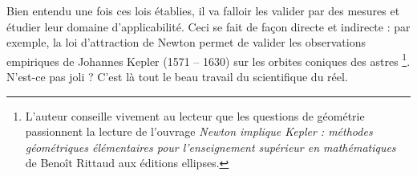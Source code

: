 

\begin{remark}
	Bien entendu une fois ces lois établies, il va falloir les valider par des mesures et étudier leur domaine d'applicabilité. Ceci se fait de façon directe et indirecte : par exemple, la loi d'attraction de Newton permet de valider les observations empiriques de Johannes Kepler (1571 -- 1630) sur les orbites coniques des astres
	\footnote{
		L'auteur conseille vivement au lecteur que les questions de géométrie passionnent la lecture de l'ouvrage \emph{\og Newton implique Kepler : méthodes géométriques élémentaires pour l'enseignement supérieur en mathématiques \fg} de Benoît Rittaud aux éditions ellipses.
	}. 
	N'est-ce pas joli ? C'est là tout le beau travail du scientifique du réel.
\end{remark}